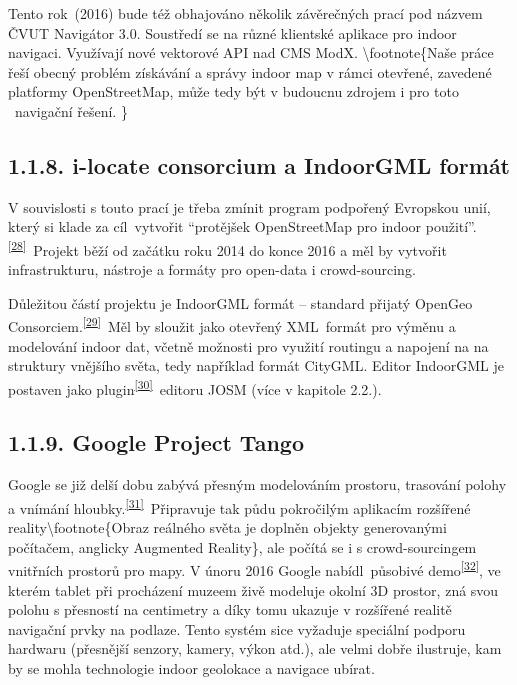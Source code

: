 Tento rok~(2016) bude též obhajováno několik závěrečných prací pod názvem ČVUT Navigátor 3.0. Soustředí se na různé klientské aplikace pro indoor navigaci. Využívají nové vektorové API nad CMS ModX. \textbackslash{}footnote\{Naše práce řeší obecný problém získávání a správy indoor map v rámci otevřené, zavedené platformy OpenStreetMap, může tedy být v budoucnu zdrojem i pro toto ~navigační řešení. \}

\subsection{1.1.8. i-locate consorcium a IndoorGML formát}\label{i-locate-consorcium-a-indoorgml-formuxe1t}

V souvislosti s touto prací je třeba zmínit program podpořený Evropskou unií, který si klade za cíl~vytvořit ``protějšek OpenStreetMap pro indoor použití''.\textsuperscript{\href{}{{[}28{]}}}~Projekt běží od začátku roku 2014 do konce 2016 a měl by vytvořit infrastrukturu, nástroje a formáty pro open-data i crowd-sourcing.

Důležitou částí projektu je IndoorGML formát -- standard přijatý OpenGeo Consorciem.\textsuperscript{\href{}{{[}29{]}}}~Měl by sloužit jako otevřený XML~formát pro výměnu a modelování indoor dat, včetně možnosti pro využití routingu a napojení na na struktury vnějšího světa, tedy například formát CityGML. Editor IndoorGML je postaven jako plugin\textsuperscript{\href{}{{[}30{]}}}~editoru JOSM (více v kapitole 2.2.).

\subsection{1.1.9. Google Project Tango}\label{google-project-tango}

Google se již delší dobu zabývá přesným modelováním prostoru, trasování polohy a vnímání hloubky.\textsuperscript{\href{}{{[}31{]}}}~Připravuje tak půdu pokročilým aplikacím rozšířené reality\textbackslash{}footnote\{Obraz reálného světa je doplněn objekty generovanými počítačem, anglicky Augmented Reality\}, ale počítá se i s crowd-sourcingem vnitřních prostorů pro mapy. V únoru 2016 Google nabídl~působivé demo\textsuperscript{\href{}{{[}32{]}}}, ve kterém tablet při procházení muzeem živě modeluje okolní 3D prostor, zná svou polohu s přesností na centimetry a díky tomu ukazuje v rozšířené realitě navigační prvky na podlaze. Tento systém sice vyžaduje speciální podporu hardwaru (přesnější senzory, kamery, výkon atd.), ale velmi dobře ilustruje, kam by se mohla technologie indoor geolokace a navigace ubírat.

